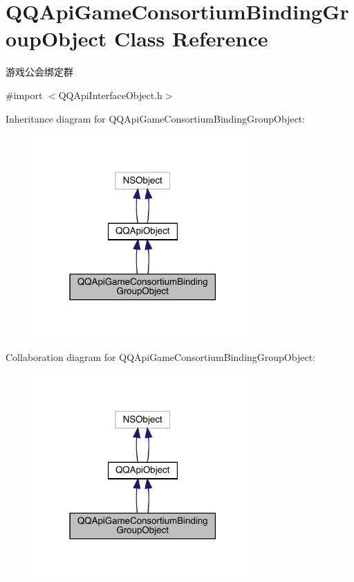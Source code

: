 \hypertarget{interface_q_q_api_game_consortium_binding_group_object}{}\section{Q\+Q\+Api\+Game\+Consortium\+Binding\+Group\+Object Class Reference}
\label{interface_q_q_api_game_consortium_binding_group_object}


游戏公会绑定群  




{\ttfamily \#import $<$Q\+Q\+Api\+Interface\+Object.\+h$>$}



Inheritance diagram for Q\+Q\+Api\+Game\+Consortium\+Binding\+Group\+Object\+:\nopagebreak
\begin{figure}[H]
\begin{center}
\leavevmode
\includegraphics[width=238pt]{interface_q_q_api_game_consortium_binding_group_object__inherit__graph}
\end{center}
\end{figure}


Collaboration diagram for Q\+Q\+Api\+Game\+Consortium\+Binding\+Group\+Object\+:\nopagebreak
\begin{figure}[H]
\begin{center}
\leavevmode
\includegraphics[width=238pt]{interface_q_q_api_game_consortium_binding_group_object__coll__graph}
\end{center}
\end{figure}
